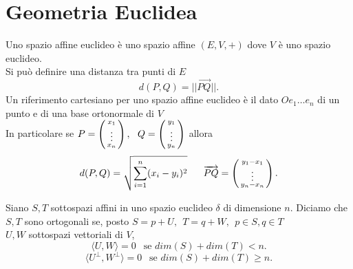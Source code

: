 \documentclass[12px]{article}
\begin{document}
\section{Geometria Euclidea}
Uno spazio affine euclideo è uno spazio affine $(E,V, +)$ dove $V$ è uno spazio euclideo.\\
Si può definire una distanza tra punti di $E$ 
\[
 d(P,Q) = ||\overrightarrow{PQ}||
.\] 
Un riferimento cartesiano per uno spazio affine euclideo è il dato $Oe_1\ldots e_n$ di un punto e di una base ortonormale di $V$\\
In particolare se $P = \left(\begin{smallmatrix} x_1\\\vdots\\x_n\end{smallmatrix}\right), \ \ Q = \left(\begin{smallmatrix}y_1\\\vdots\\y_n\end{smallmatrix}\right)$ allora
\[
	d(P,Q) = \sqrt{\sum^n_{i=1}(x_i - y_i)^2}\ \ \ \ \ \overrightarrow{PQ} = \icol{y_1 - x_1\\ \vdots \\ y_n - x_n}
.\] 
\newpage
\begin{defi}
	Siano $S,T$ sottospazi affini in uno spazio euclideo $\delta$ di dimensione $n$. Diciamo che $S,T$ sono ortogonali se, posto $S = p + U, \ \ T= q + W, \ \ p\in S,q\in T$\\
	 $U,W$ sottospazi vettoriali di $V$,
	 \[
		 \langle U, W \rangle = 0\ \ \text{ se } dim(S) + dim(T) < n
	 .\] 
	 \[
		 \langle U^\perp, W^\perp \rangle  = 0 \ \ \text{ se } dim(S) + dim(T) \geq n
	 .\] 
\end{defi}
\end{document}
